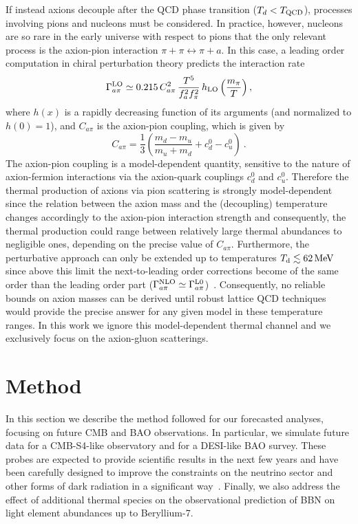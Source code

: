 \documentclass[fleqn,usenatbib,letters]{mnras}
\begin{document}
If instead axions decouple after the QCD phase transition ($T_d<T_{\rm QCD}$), processes involving pions and nucleons must be considered. In practice, however, nucleons are so rare in the early universe with respect to pions that the only relevant process is the axion-pion interaction $\pi+\pi \leftrightarrow \pi + a $. In this case, a leading order computation in chiral perturbation theory predicts the interaction rate~\citep{DiLuzio:2020wdo, DiLuzio:2021vjd}
\begin{equation}
\Gamma_{a \pi}^{\rm LO} \simeq 0.215\, C_{a \pi}^{2}\, \frac{T^{5}}{f_{a}^{2} f_{\pi}^{2}}\, h_{\rm{LO}}\left(\frac{m_{\pi}}{T}\right),
\label{Gamma_api}
\end{equation}
where $h(x)$ is a rapidly decreasing function of its arguments (and normalized to $h(0)=1$), and $C_{a \pi}$ is the axion-pion coupling, which is given by 
\begin{equation}
C_{a \pi}=\frac{1}{3}\left(\frac{m_{d}-m_{u}}{m_{u}+m_{d}}+c_{d}^{0}-c_{u}^{0}\right)~.
\end{equation}
The axion-pion coupling is a model-dependent quantity, sensitive to the nature of axion-fermion interactions via the axion-quark couplings $c_{d}^{0}$ and $c_{u}^{0}$. Therefore the thermal production of axions via pion scattering is strongly model-dependent since the relation between the axion mass and the (decoupling) temperature changes accordingly to the axion-pion interaction strength and consequently, the thermal production could range between relatively large thermal abundances to negligible ones, depending on the precise value of $C_{a \pi}$. Furthermore, the perturbative approach can only be extended up to temperatures $T_{\rm d}\lesssim 62\,\rm{MeV}$ since above this limit the next-to-leading order corrections become of the same order than the leading order part ($\Gamma_{a\pi}^{\rm NLO}\simeq \Gamma^{\rm L0}_{a\pi}$)~\citep{DiLuzio:2021vjd}. Consequently, no reliable bounds on axion masses can be derived until robust lattice QCD techniques would provide the precise answer for any given model in these temperature ranges. In this work we ignore this model-dependent thermal channel and we exclusively focus on the axion-gluon scatterings.

\section{Method}\label{Sec.Method}
In this section we describe the method followed for our forecasted analyses, focusing on future CMB and BAO observations. In particular, we simulate future data for a CMB-S4-like \citep{Abazajian:2016yjj} observatory and for a DESI-like \citep{DESI,DESI:2013agm} BAO survey. These probes are expected to provide scientific results in the next few years and have been carefully designed to improve the constraints on the neutrino sector and other forms of dark radiation in a significant way~\citep{Abazajian:2016yjj,DESI,constraint_neutrino_stageIV,Abazajian:2019oqj}. Finally, we also address the effect of additional thermal species on the observational prediction of BBN on light element abundances up to Beryllium-7.
\end{document}
